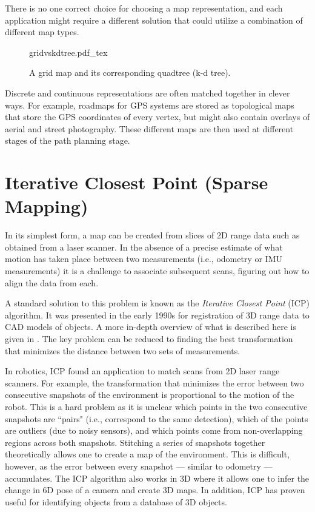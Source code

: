 There is no one correct choice for choosing a map representation, and each application might require a different solution that could utilize a combination of different map types.

\begin{figure}
    \centering
    \def\svgwidth{\textwidth}
    {gridvskdtree.pdf_tex}
    \caption{A grid map and its corresponding quadtree (k-d tree).\label{fig:gridvskdtree}}
\end{figure}

Discrete and continuous representations are often matched together in clever ways. For example, roadmaps for GPS systems are stored as topological maps that store the GPS coordinates of every vertex, but might also contain overlays of aerial and street photography. These different maps are then used at different stages of the path planning stage.


\section{Iterative Closest Point (Sparse Mapping)}\label{sec:ICP}
In its simplest form, a map can be created from slices of 2D range data such as obtained from a laser scanner. In the absence of a precise estimate of what motion has taken place between two measurements (i.e., odometry or IMU measurements) it is a challenge to associate subsequent scans, figuring out how to align the data from each. 

A standard solution to this problem is known as the \emph{Iterative Closest Point} (ICP) algorithm. It was presented in the early 1990s for registration of 3D range data to CAD models of objects. A more in-depth overview of what is described here is given in \cite{rusinkiewicz01}. The key problem can be reduced to finding the best transformation that minimizes the distance between two sets of measurements.

In robotics, ICP found an application to match scans from 2D laser range scanners. For example, the transformation that minimizes the error between two consecutive snapshots of the environment is proportional to the motion of the robot. This is a hard problem as it is unclear which points in the two consecutive snapshots are ``pairs" (i.e., correspond to the same detection), which of the points are outliers (due to noisy sensors), and which points come from non-overlapping regions across both snapshots. Stitching a series of snapshots together theoretically allows one to create a map of the environment. This is difficult, however, as the error between every snapshot --- similar to odometry --- accumulates.   The ICP algorithm also works in 3D where it allows one to infer the change in 6D pose of a camera and create 3D maps. In addition, ICP has proven useful for identifying objects from a database of 3D objects.


